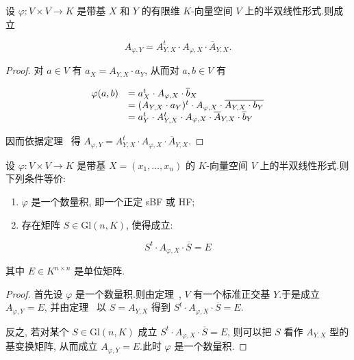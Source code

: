 \begin{theorem}\label{thm:7.3.5}
设 $\varphi \colon V \times V \longrightarrow K$ 是带基 $X$ 和 $Y$ 的有限维 $K$-向量空间 $V$ 上的半双线性形式.则成立

\[
A_{\varphi, Y} = A_{Y, X}^{t} \cdot A_{\varphi, X} \cdot \overline{A}_{Y, X}\text{.}
\]
\end{theorem}

\begin{proof}
对 $a \in V$ 有 $a_X = A_{Y, X} \cdot a_Y$, 从而对 $a, b \in V$ 有

\[
\begin{array}{r l}
\varphi(a, b) & = a_X^{t} \cdot A_{\varphi, X} \cdot \overline{b}_X \\
& = (A_{Y, X} \cdot a_Y)^{t} \cdot A_{\varphi, X} \cdot \overline{A_{Y, X} \cdot b_Y} \\
& = a_Y^{t} \cdot A_{Y, X}^{t} \cdot A_{\varphi, X} \cdot \overline{A}_{Y, X} \cdot \overline{b}_Y
\end{array}
\]

因而依据定理~ 得 $A_{\varphi, Y} = A_{Y, X}^{t} \cdot A_{\varphi, X} \cdot \overline{A}_{Y, X}$.
\end{proof}

\begin{corollary}\label{cor:7.3.6}
设 $\varphi \colon V \times V \longrightarrow K$ 是带基 $X = (x_1, \ldots, x_n)$ 的 $K$-向量空间 $V$ 上的半双线性形式.则下列条件等价:
\begin{enumerate}
\item[(i)] $\varphi$ 是一个数量积, 即一个正定 sBF 或 HF;
\item[(ii)] 存在矩阵 $S \in \mathrm{Gl}(n, K)$, 使得成立:
\end{enumerate}

\[
S^{t} \cdot A_{\varphi, X} \cdot \overline{S} = E
\]

其中 $E \in K^{n \times n}$ 是单位矩阵.
\end{corollary}

\begin{proof}
首先设 $\varphi$ 是一个数量积.则由定理~, $V$ 有一个标准正交基 $Y$.于是成立 $A_{\varphi, Y} = E$, 并由定理~ 以 $S = A_{Y, X}$ 得到 $S^{t} \cdot A_{\varphi, X} \cdot \overline{S} = E$.

反之, 若对某个 $S \in \mathrm{Gl}(n, K)$ 成立 $S^{t} \cdot A_{\varphi, X} \cdot \overline{S} = E$, 则可以把 $S$ 看作 $A_{Y, X}$ 型的基变换矩阵, 从而成立 $A_{\varphi, Y} = E$.此时 $\varphi$ 是一个数量积.
\end{proof}

